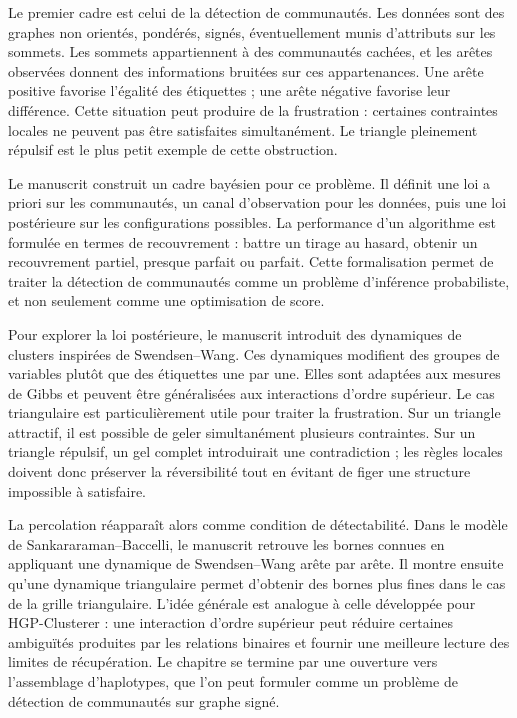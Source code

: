 Le premier cadre est celui de la détection de communautés. Les données sont des graphes non orientés, pondérés, signés, éventuellement munis d'attributs sur les sommets. Les sommets appartiennent à des communautés cachées, et les arêtes observées donnent des informations bruitées sur ces appartenances. Une arête positive favorise l'égalité des étiquettes ; une arête négative favorise leur différence. Cette situation peut produire de la frustration : certaines contraintes locales ne peuvent pas être satisfaites simultanément. Le triangle pleinement répulsif est le plus petit exemple de cette obstruction.

Le manuscrit construit un cadre bayésien pour ce problème. Il définit une loi a priori sur les communautés, un canal d'observation pour les données, puis une loi postérieure sur les configurations possibles. La performance d'un algorithme est formulée en termes de recouvrement : battre un tirage au hasard, obtenir un recouvrement partiel, presque parfait ou parfait. Cette formalisation permet de traiter la détection de communautés comme un problème d'inférence probabiliste, et non seulement comme une optimisation de score.

Pour explorer la loi postérieure, le manuscrit introduit des dynamiques de clusters inspirées de Swendsen--Wang. Ces dynamiques modifient des groupes de variables plutôt que des étiquettes une par une. Elles sont adaptées aux mesures de Gibbs et peuvent être généralisées aux interactions d'ordre supérieur. Le cas triangulaire est particulièrement utile pour traiter la frustration. Sur un triangle attractif, il est possible de geler simultanément plusieurs contraintes. Sur un triangle répulsif, un gel complet introduirait une contradiction ; les règles locales doivent donc préserver la réversibilité tout en évitant de figer une structure impossible à satisfaire.

La percolation réapparaît alors comme condition de détectabilité. Dans le modèle de Sankararaman--Baccelli, le manuscrit retrouve les bornes connues en appliquant une dynamique de Swendsen--Wang arête par arête. Il montre ensuite qu'une dynamique triangulaire permet d'obtenir des bornes plus fines dans le cas de la grille triangulaire. L'idée générale est analogue à celle développée pour HGP-Clusterer : une interaction d'ordre supérieur peut réduire certaines ambiguïtés produites par les relations binaires et fournir une meilleure lecture des limites de récupération. Le chapitre se termine par une ouverture vers l'assemblage d'haplotypes, que l'on peut formuler comme un problème de détection de communautés sur graphe signé.

